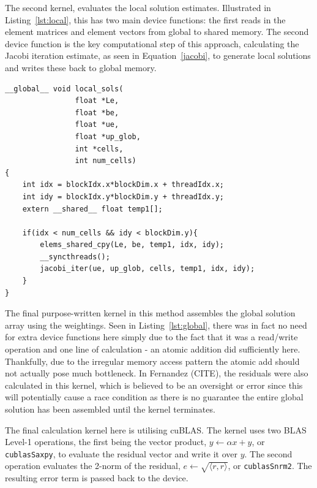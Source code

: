 The second kernel, evaluates the local solution estimates. Illustrated in Listing~\ref{lst:local}, this has two main device functions: the first reads in the element matrices and element vectors from global to shared memory. The second device function is the key computational step of this approach, calculating the Jacobi iteration estimate, as seen in Equation~\eqref{jacobi}, to generate local solutions and writes these back to global memory.
\begin{lstlisting}[style=cppStyle, caption = {Kernel to evaluate local solutions in FEMSES using Jacobi iteration.}, label={lst:local}]
__global__ void local_sols(
                float *Le,
                float *be,
                float *ue,
                float *up_glob,
                int *cells,
                int num_cells)
{
    int idx = blockIdx.x*blockDim.x + threadIdx.x;
    int idy = blockIdx.y*blockDim.y + threadIdx.y;
    extern __shared__ float temp1[]; 

    if(idx < num_cells && idy < blockDim.y){
        elems_shared_cpy(Le, be, temp1, idx, idy);
        __syncthreads();
        jacobi_iter(ue, up_glob, cells, temp1, idx, idy);
    }
}
\end{lstlisting}

The final purpose-written kernel in this method assembles the global solution array using the weightings. Seen in Listing~\ref{lst:global}, there was in fact no need for extra device functions here simply due to the fact that it was a read/write operation and one line of calculation - an atomic addition did sufficiently here. Thankfully, due to the irregular memory access pattern the atomic add should not actually pose much bottleneck. In Fernandez (CITE), the residuals were also calculated in this kernel, which is believed to be an oversight or error since this will potentially cause a race  condition as there is no guarantee the entire global solution has been assembled until the kernel terminates.

The final calculation kernel here is utilising cuBLAS. The kernel uses two BLAS Level-1 operations, the first being the vector product, $y \leftarrow \alpha x + y$, or \texttt{cublasSaxpy}, to evaluate the residual vector and write it over $y$. The second operation evaluates the 2-norm of the residual, $e \leftarrow \sqrt{\langle r, r\rangle}$, or \texttt{cublasSnrm2}. The resulting error term is passed back to the device.

